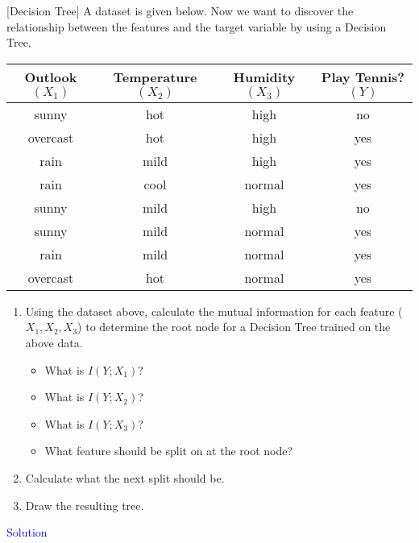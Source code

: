 \item {} [Decision Tree] A dataset is given below. Now we want to discover the relationship between the features and the target variable by using a Decision Tree.
\
\begin{table*}[h]
    \centering
    \begin{tabular}{|c|c|c|c|}
        \hline
        Outlook $\left(X_{1}\right)$ & Temperature $\left(X_{2}\right)$ & Humidity $\left(X_{3}\right)$ & Play Tennis? $(Y)$ \\
        \hline
        sunny & hot & high & no \\
        \hline
        overcast & hot & high & yes \\
        \hline
        rain & mild & high & yes \\
        \hline
        rain & cool & normal & yes \\
        \hline
        sunny & mild & high & no \\
        \hline
        sunny & mild & normal & yes \\
        \hline
        rain & mild & normal & yes \\
        \hline
        overcast & hot & normal & yes \\
        \hline
    \end{tabular}
\end{table*}

\begin{enumerate}
    \item Using the dataset above, calculate the mutual information for each feature ($X_{1}, X_{2}, X_{3}$) to determine the root node for a Decision Tree trained on the above data.
    \begin{itemize}
        \item What is $I\left(Y ; X_{1}\right)$? 
        \item What is $I\left(Y ; X_{2}\right)$? 
        \item What is $I\left(Y ; X_{3}\right)$? \defpoints{3}
        \item What feature should be split on at the root node? 
    \end{itemize}

    \item Calculate what the next split should be. 

    \item Draw the resulting tree. 
\end{enumerate}

\textcolor{blue}{Solution} \\






\newpage
